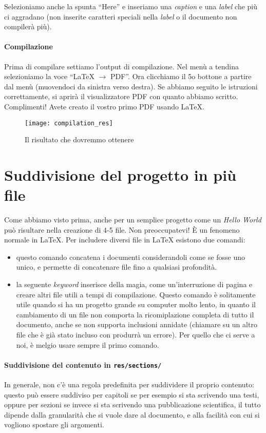 Selezioniamo anche la spunta ``Here'' e inseriamo una \textit{caption} e una
\textit{label} che più ci aggradano (non inserite caratteri speciali nella
\textit{label} o il documento non compilerà più).

\paragraph*{Compilazione} Prima di compilare settiamo l'output di compilazione.
Nel menù a tendina selezioniamo la voce ``LaTeX $\to$ PDF''. Ora clicchiamo il
5o bottone a partire dal menù (muovendoci da sinistra verso destra). Se abbiamo
seguito le istruzioni correttamente, si aprirà il visualizzatore PDF con quanto
abbiamo scritto. Complimenti! Avete creato il vostro primo PDF usando \LaTeX{}.

\begin{figure}[H]
 \centering
 \texttt{[image: compilation\_res]}
 \caption{Il risultato che dovremmo ottenere}
 \label{img:compilation_res}
\end{figure}

\newpage

\section{Suddivisione del progetto in più file}
\label{sec:prog_piu_file}

Come abbiamo visto prima, anche per un semplice progetto come un \textit{Hello
World} può risultare nella creazione di 4-5 file. Non preoccupatevi! È un
fenomeno normale in \LaTeX{}.
Per includere diversi file in \LaTeX{} esistono due comandi:
\begin{itemize}
 \item \verb!! questo comando concatena i documenti considerandoli
come se fosse uno unico, e permette di concatenare file fino a qualsiasi
profondità.
 \item \verb!! la seguente \textit{keyword} inserisce della magia,
come un'interruzione di pagina e creare altri file utili a tempi di
compilazione. Questo comando è solitamente utile quando si ha un progetto
grande su computer molto lento, in quanto il cambiamento di un file non
comporta la ricomiplazione completa di tutto il documento, anche se non
supporta inclusioni annidate (chiamare \verb!! su un altro file che
è già stato incluso con \verb!! produrrà un errore). Per quello che
ci serve a noi, è melgio usare sempre il primo comando.
\end{itemize}

\paragraph*{Suddivisione del contenuto in \texttt{res/sections/}} In generale,
non c'è una regola predefinita per suddividere il proprio contenuto: questo può
essere suddiviso per capitoli se per esempio si sta scrivendo una testi, oppure
per sezioni se invece si sta scrivendo una pubblicazione scientifica, il tutto
dipende dalla granularità che si vuole dare al documento, e alla facilità con
cui si vogliono spostare gli argomenti.
